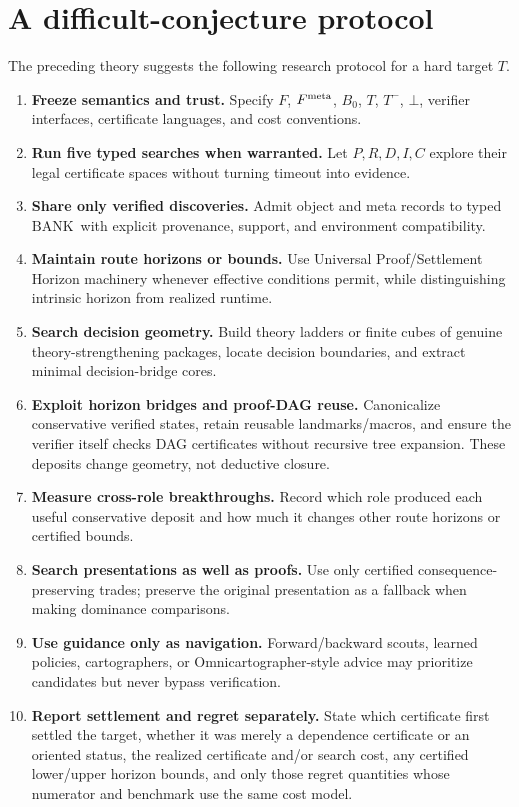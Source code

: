 \documentclass[11pt]{article}
\theoremstyle{remark}
\newcommand{\BANK}{\ensuremath{\mathrm{BANK}}}
\begin{document}
\section{A difficult-conjecture protocol}

The preceding theory suggests the following research protocol for a hard target $T$.

\begin{enumerate}
\item \textbf{Freeze semantics and trust.} Specify $F$, $F^{\rm meta}$, $B_0$, $T$, $T^-$, $\bot$, verifier interfaces, certificate languages, and cost conventions.
\item \textbf{Run five typed searches when warranted.} Let $P,R,D,I,C$ explore their legal certificate spaces without turning timeout into evidence.
\item \textbf{Share only verified discoveries.} Admit object and meta records to typed \BANK\ with explicit provenance, support, and environment compatibility.
\item \textbf{Maintain route horizons or bounds.} Use Universal Proof/Settlement Horizon machinery whenever effective conditions permit, while distinguishing intrinsic horizon from realized runtime.
\item \textbf{Search decision geometry.} Build theory ladders or finite cubes of genuine theory-strengthening packages, locate decision boundaries, and extract minimal decision-bridge cores.
\item \textbf{Exploit horizon bridges and proof-DAG reuse.} Canonicalize conservative verified states, retain reusable landmarks/macros, and ensure the verifier itself checks DAG certificates without recursive tree expansion. These deposits change geometry, not deductive closure.
\item \textbf{Measure cross-role breakthroughs.} Record which role produced each useful conservative deposit and how much it changes other route horizons or certified bounds.
\item \textbf{Search presentations as well as proofs.} Use only certified consequence-preserving trades; preserve the original presentation as a fallback when making dominance comparisons.
\item \textbf{Use guidance only as navigation.} Forward/backward scouts, learned policies, cartographers, or Omnicartographer-style advice may prioritize candidates but never bypass verification.
\item \textbf{Report settlement and regret separately.} State which certificate first settled the target, whether it was merely a dependence certificate or an oriented status, the realized certificate and/or search cost, any certified lower/upper horizon bounds, and only those regret quantities whose numerator and benchmark use the same cost model.
\end{enumerate}
\end{document}
